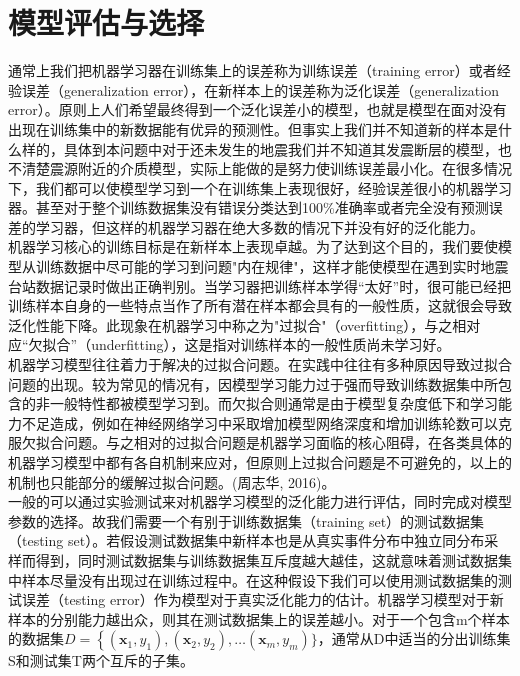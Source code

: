 \section{模型评估与选择}
 \indent 通常上我们把机器学习器在训练集上的误差称为训练误差（training error）或者经验误差（generalization error），在新样本上的误差称为泛化误差（generalization error）。原则上人们希望最终得到一个泛化误差小的模型，也就是模型在面对没有出现在训练集中的新数据能有优异的预测性。但事实上我们并不知道新的样本是什么样的，具体到本问题中对于还未发生的地震我们并不知道其发震断层的模型，也不清楚震源附近的介质模型，实际上能做的是努力使训练误差最小化。在很多情况下，我们都可以使模型学习到一个在训练集上表现很好，经验误差很小的机器学习器。甚至对于整个训练数据集没有错误分类达到100\%准确率或者完全没有预测误差的学习器，但这样的机器学习器在绝大多数的情况下并没有好的泛化能力。\\
 \indent 机器学习核心的训练目标是在新样本上表现卓越。为了达到这个目的，我们要使模型从训练数据中尽可能的学习到问题"内在规律"，这样才能使模型在遇到实时地震台站数据记录时做出正确判别。当学习器把训练样本学得“太好”时，很可能已经把训练样本自身的一些特点当作了所有潜在样本都会具有的一般性质，这就很会导致泛化性能下降。此现象在机器学习中称之为"过拟合"（overfitting），与之相对应“欠拟合”（underfitting），这是指对训练样本的一般性质尚未学习好。\\
 \indent 机器学习模型往往着力于解决的过拟合问题。在实践中往往有多种原因导致过拟合问题的出现。较为常见的情况有，因模型学习能力过于强而导致训练数据集中所包含的非一般特性都被模型学习到。而欠拟合则通常是由于模型复杂度低下和学习能力不足造成，例如在神经网络学习中采取增加模型网络深度和增加训练轮数可以克服欠拟合问题。与之相对的过拟合问题是机器学习面临的核心阻碍，在各类具体的机器学习模型中都有各自机制来应对，但原则上过拟合问题是不可避免的，以上的机制也只能部分的缓解过拟合问题。(周志华, 2016)。\\
 \indent 一般的可以通过实验测试来对机器学习模型的泛化能力进行评估，同时完成对模型参数的选择。故我们需要一个有别于训练数据集（training set）的测试数据集（testing set）。若假设测试数据集中新样本也是从真实事件分布中独立同分布采样而得到，同时测试数据集与训练数据集互斥度越大越佳，这就意味着测试数据集中样本尽量没有出现过在训练过程中。在这种假设下我们可以使用测试数据集的测试误差（testing error）作为模型对于真实泛化能力的估计。机器学习模型对于新样本的分别能力越出众，则其在测试数据集上的误差越小。对于一个包含m个样本的数据集$D=\left\{\left(\boldsymbol{x}_{1}, y_{1}\right),\left(\boldsymbol{x}_{2}, y_{2}\right), \ldots\right.\left(\boldsymbol{x}_{m}, y_{m}\right) \}$，通常从D中适当的分出训练集S和测试集T两个互斥的子集。\\

